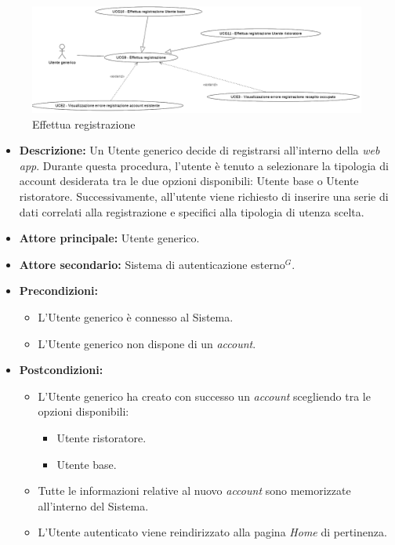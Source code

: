 \newpage
{}
\label{usecase:Effettua registrazione}

\begin{figure}[h]
	\centering
	\includegraphics[width=0.99\textwidth]{./uml/UCG9-10-11.png} 
	\caption{Effettua registrazione}
	\label{fig:UCG9-10-11}
  \end{figure}

\begin{itemize}
	\item \textbf{Descrizione:} Un Utente generico decide di registrarsi all'interno della \textit{web app}. 
    Durante questa procedura, l'utente è tenuto a selezionare la tipologia di account desiderata tra le due opzioni disponibili: Utente base o Utente ristoratore. 
    Successivamente, all'utente viene richiesto di inserire una serie di dati correlati alla registrazione e specifici alla tipologia di utenza scelta.

	\item \textbf{Attore principale:} Utente generico.
	\item \textbf{Attore secondario:} Sistema di autenticazione esterno$^G$.
	\item \textbf{Precondizioni:}
        \begin{itemize}
            \item L'Utente generico è connesso al Sistema.
            \item L'Utente generico non dispone di un \textit{account}.
        \end{itemize}
	\item \textbf{Postcondizioni:}
        \begin{itemize} 
            \item L'Utente generico ha creato con successo un \textit{account} scegliendo tra le opzioni disponibili:
            \begin{itemize}
                \item Utente ristoratore.
                \item Utente base.
            \end{itemize}
            \item Tutte le informazioni relative al nuovo \textit{account} sono memorizzate all'interno del Sistema.
            \item L'Utente autenticato viene reindirizzato alla pagina \textit{Home} di pertinenza.
        \end{itemize}



\end{itemize}
